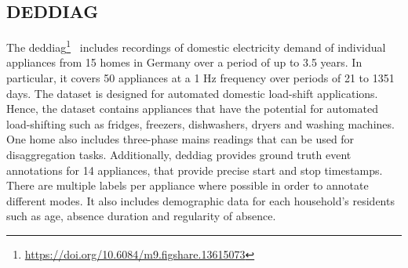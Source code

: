 \newpage

\subsection{DEDDIAG}

The \acrlong{deddiag}\footnote{\url{https://doi.org/10.6084/m9.figshare.13615073}}~\parencite{wenningerDEDDIAGDomesticElectricity2021} includes recordings of domestic electricity demand of individual appliances from 15 homes in Germany over a period of up to 3.5 years. In particular, it covers 50 appliances at a 1 Hz frequency over periods of 21 to 1351 days. The dataset is designed for automated domestic load-shift applications. Hence, the dataset contains appliances that have the potential for automated load-shifting such as fridges, freezers, dishwashers, dryers and washing machines. One home also includes three-phase mains readings that can be used for disaggregation tasks. Additionally, \acrshort{deddiag} provides ground truth event annotations for 14 appliances, that provide precise start and stop timestamps. There are multiple labels per appliance where possible in order to annotate different modes. It also includes demographic data for each household's residents such as age, absence duration and regularity of absence.

